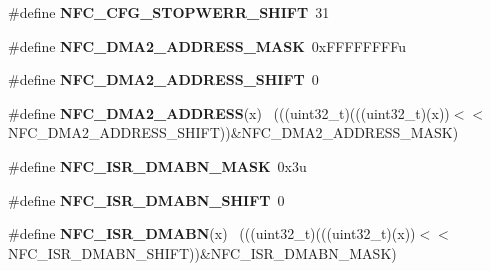 \begin{DoxyCompactItemize}
\item 
\hypertarget{group___n_f_c___register___masks_ga684cdf07a6e5776e28a7961d056d90ed}{}\#define {\bfseries N\+F\+C\+\_\+\+C\+F\+G\+\_\+\+S\+T\+O\+P\+W\+E\+R\+R\+\_\+\+S\+H\+I\+F\+T}~31\label{group___n_f_c___register___masks_ga684cdf07a6e5776e28a7961d056d90ed}

\item 
\hypertarget{group___n_f_c___register___masks_gaba51cc94498c11721a41463731af5825}{}\#define {\bfseries N\+F\+C\+\_\+\+D\+M\+A2\+\_\+\+A\+D\+D\+R\+E\+S\+S\+\_\+\+M\+A\+S\+K}~0x\+F\+F\+F\+F\+F\+F\+F\+Fu\label{group___n_f_c___register___masks_gaba51cc94498c11721a41463731af5825}

\item 
\hypertarget{group___n_f_c___register___masks_ga0cb6027a39f55727897d3f6e6909e88b}{}\#define {\bfseries N\+F\+C\+\_\+\+D\+M\+A2\+\_\+\+A\+D\+D\+R\+E\+S\+S\+\_\+\+S\+H\+I\+F\+T}~0\label{group___n_f_c___register___masks_ga0cb6027a39f55727897d3f6e6909e88b}

\item 
\hypertarget{group___n_f_c___register___masks_ga81ac50040f55fd4f288b6d968f322467}{}\#define {\bfseries N\+F\+C\+\_\+\+D\+M\+A2\+\_\+\+A\+D\+D\+R\+E\+S\+S}(x)                                        ~(((uint32\+\_\+t)(((uint32\+\_\+t)(x))$<$$<$N\+F\+C\+\_\+\+D\+M\+A2\+\_\+\+A\+D\+D\+R\+E\+S\+S\+\_\+\+S\+H\+I\+F\+T))\&N\+F\+C\+\_\+\+D\+M\+A2\+\_\+\+A\+D\+D\+R\+E\+S\+S\+\_\+\+M\+A\+S\+K)\label{group___n_f_c___register___masks_ga81ac50040f55fd4f288b6d968f322467}

\item 
\hypertarget{group___n_f_c___register___masks_ga8a2577805fcc4e6814a0c9eaa6884172}{}\#define {\bfseries N\+F\+C\+\_\+\+I\+S\+R\+\_\+\+D\+M\+A\+B\+N\+\_\+\+M\+A\+S\+K}~0x3u\label{group___n_f_c___register___masks_ga8a2577805fcc4e6814a0c9eaa6884172}

\item 
\hypertarget{group___n_f_c___register___masks_gae2c0200c948c772b7f16faadd54c8d27}{}\#define {\bfseries N\+F\+C\+\_\+\+I\+S\+R\+\_\+\+D\+M\+A\+B\+N\+\_\+\+S\+H\+I\+F\+T}~0\label{group___n_f_c___register___masks_gae2c0200c948c772b7f16faadd54c8d27}

\item 
\hypertarget{group___n_f_c___register___masks_ga71610756b6433538c3d008ddfac9d69c}{}\#define {\bfseries N\+F\+C\+\_\+\+I\+S\+R\+\_\+\+D\+M\+A\+B\+N}(x)                                              ~(((uint32\+\_\+t)(((uint32\+\_\+t)(x))$<$$<$N\+F\+C\+\_\+\+I\+S\+R\+\_\+\+D\+M\+A\+B\+N\+\_\+\+S\+H\+I\+F\+T))\&N\+F\+C\+\_\+\+I\+S\+R\+\_\+\+D\+M\+A\+B\+N\+\_\+\+M\+A\+S\+K)\label{group___n_f_c___register___masks_ga71610756b6433538c3d008ddfac9d69c}


\end{DoxyCompactItemize}
